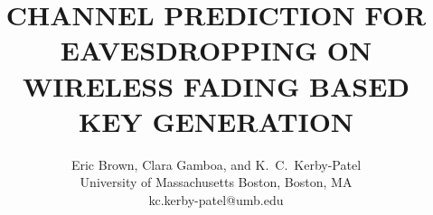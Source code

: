 \documentclass{allertonproc}
\title{CHANNEL PREDICTION FOR EAVESDROPPING ON WIRELESS FADING BASED KEY GENERATION}
\date{}
\author{Eric Brown, Clara Gamboa, and K.~C.~Kerby-Patel\\University of Massachusetts Boston, Boston, MA\\kc.kerby-patel@umb.edu}
\begin{document}
\maketitle
\abstract{
}
\end{document}
